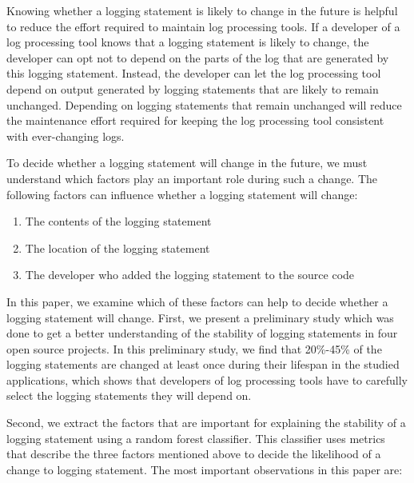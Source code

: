 Knowing whether a logging statement is likely to change in the future is helpful to reduce the effort required to maintain log processing tools. If a developer of a log processing tool knows that a logging statement is likely to change, the developer can opt not to depend on the parts of the log that are generated by this logging statement. Instead, the developer can let the log processing tool depend on output generated by logging statements that are likely to remain unchanged. Depending on logging statements that remain unchanged will reduce the maintenance effort required for keeping the log processing tool consistent with ever-changing logs. 


To decide whether a logging statement will change in the future, we must understand which factors play an important role during such a change. The following factors can influence whether a logging statement will change:
\begin{enumerate}
\item The contents of the logging statement
\item The location of the logging statement
\item The developer who added the logging statement to the source code
\end{enumerate}
In this paper, we examine which of these factors can help to decide whether a logging statement will change. First, we present a preliminary study which was done to get a better understanding of the stability of logging statements in four open source projects. In this preliminary study, we find that 20\%-45\% of the logging statements are changed at least once during their lifespan in the studied applications, which shows that developers of log processing tools have to carefully select the logging statements they will depend on. 

Second, we extract the factors that are important for explaining the stability of a logging statement using a random forest classifier. This classifier uses metrics that describe the three factors mentioned above to decide the likelihood of a change to logging statement.
The most important observations in this paper are:



